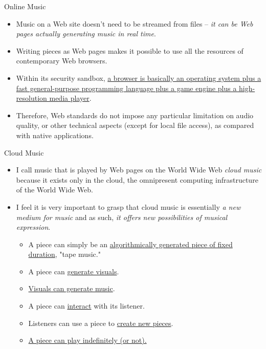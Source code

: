 \documentclass{beamer}
\begin{document}
\begin{frame}{Online Music}
\begin{itemize}
\item Music on a Web site doesn't need to be streamed from files -- \emph{it can be Web pages actually generating music in real time}.
\item Writing pieces as Web pages makes it possible to use all the resources of contemporary Web browsers.
\item Within its security sandbox, \href{https://html5test.co/}{a browser is basically an operating system plus a fast general-purpose programming language plus a game engine plus a high-resolution media player}.
\item Therefore, Web standards do not impose any particular limitation on audio quality, or other technical aspects (except for local file access), as compared with native applications.
\end{itemize}
\end{frame}

\begin{frame}{Cloud Music}
\begin{itemize}
\item I call music that is played by Web pages on the World Wide Web \emph{cloud music} because it exists only in the cloud, the omnipresent computing infrastructure of the World Wide Web.
\item I feel it is very important to grasp that cloud music is essentially \emph{a new medium for music} and as such,\emph{ it offers new possibilities of musical expression}.
\begin{itemize}
\item A piece can simply be an \href{http://localhost:8000/cloud5-example-score-generator.html}{algorithmically generated piece of fixed duration}, "tape music."
\item A piece can \href{http://localhost:8000/cloud_music_no_2.html}{generate visuals}.
\item \href{http://localhost:8000/cloud_music_no_1.html}{Visuals can generate music}.
\item A piece can \href{http://localhost:8000/cloud5-example-visual-music.html}{interact} with its listener.
\item Listeners can use a piece to \href{http://localhost:8000/cancycle.html}{create new pieces}.
\item \href{http://localhost:8000/cancycle.html}{A piece can play indefinitely (or not).}
\end{itemize}
\end{itemize}
\end{frame}
\end{document}
